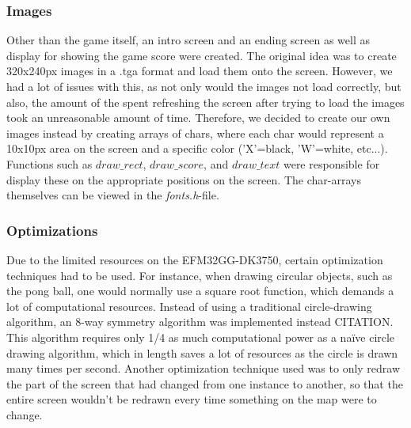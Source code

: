 \subsubsection{Images}

Other than the game itself, an intro screen and an ending screen as well as display for showing the game score were created. The original idea was to create 320x240px images in a .tga format and load them onto the screen. However, we had a lot of issues with this, as not only would the images not load correctly, but also, the amount of the spent refreshing the screen after trying to load the images took an unreasonable amount of time. Therefore, we decided to create our own images instead by creating arrays of chars, where each char would represent a 10x10px area on the screen and a specific color ('X'=black, 'W'=white, etc...). Functions such as \emph{$draw\_rect$}, \emph{$draw\_score$}, and \emph{$draw\_text$} were responsible for display these on the appropriate positions on the screen. The char-arrays themselves can be viewed in the \emph{fonts.h}-file.


\subsubsection{Optimizations}

Due to the limited resources on the EFM32GG-DK3750, certain optimization techniques had to be used. For instance, when drawing circular objects, such as the pong ball, one would normally use a square root function, which demands a lot of computational resources. Instead of using a traditional circle-drawing algorithm, an 8-way symmetry algorithm was implemented instead CITATION. This algorithm requires only 1/4 as much computational power as a naïve circle drawing algorithm, which in length saves a lot of resources as the circle is drawn many times per second.
	Another optimization technique used was to only redraw the part of the screen that had changed from one instance to another, so that the entire screen wouldn't be redrawn every time something on the map were to change.  

